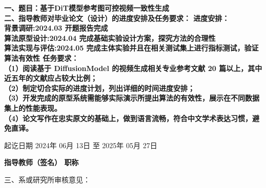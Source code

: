 \cleardoublepage
{}

{
    \bfseries
    \noindent 一、题目：基于DiT模型参考图可控视频一致性生成\\
    \noindent 二、指导教师对毕业论文（设计）的进度安排及任务要求：
    \vskip 2mm
    \noindent 进度安排：\\
    背景调研:2024.03 开题报告完成\\
    算法原型设计:2024.04 完成基础实验设计方案，探究方法的合理性\\
    算法实现与评估:2024.05 完成主体实验并且在相关测试集上进行指标测试，验证算法有效性
    \vskip 2mm
    \noindent 任务要求：\\
    （1）阅读基于 DiffusionModel 的视频生成相关专业参考文献 20 篇以上，其中近五年的文献应占较大比例；\\
    （2）制定切合实际的进度计划，列出详细的时间进度安排；\\
    （3）开发完成的原型系统需能够实际演示所提出算法的有效性，展示在不同数据集上的性能表现。\\
    （4）论文写作在忠实原文的基础上，做到语言流畅，符合中文学术表达习惯，避免直译。\\
    \vskip 10mm

    \noindent 起讫日期  \quad 2024年 \quad  06月 \quad 13日 \quad 至 \quad  \quad  2025年 \quad  05月  \quad 27日
    \begin{flushright}
        \bfseries {}
            指导教师（签名） \underline{} 职称 \underline{}
    \end{flushright}

    \noindent 三、系或研究所审核意见：\\

    \mbox{} \vfill
    \signature{负责人（签名）}
}
